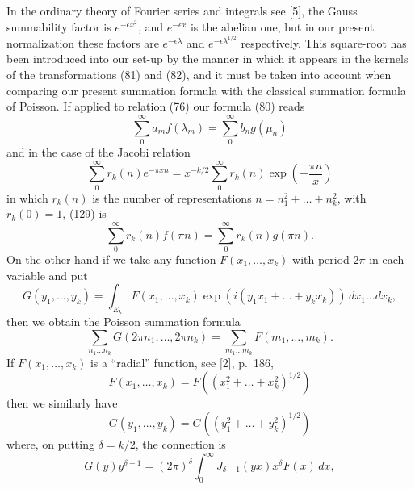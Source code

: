 \documentclass[12pt]{article}
\begin{document}
In the ordinary theory of Fourier series and integrals see [5], the Gauss summability factor is \(e^{-\epsilon x^2}\), and \(e^{-\epsilon x}\) is the abelian one, but in our present normalization these factors are \(e^{-\epsilon\lambda}\) and \(e^{-\epsilon\lambda^{1/2}}\) respectively. This square-root has been introduced into our set-up by the manner in which it appears in the kernels of the transformations (81) and (82), and it must be taken into account when comparing our present summation formula with the classical summation formula of Poisson. If applied to relation (76) our formula (80) reads
\begin{equation}
\sum_0^{\infty} a_m f(\lambda_m) = \sum_0^{\infty} b_n g(\mu_n)
\tag{129}
\end{equation}
and in the case of the Jacobi relation
\begin{equation}
\sum_0^{\infty} r_k(n)e^{-\pi xn} = x^{-k/2} \sum_0^{\infty} r_k(n) \exp \left( -\frac{\pi n}{x} \right)
\tag{130}
\end{equation}
in which \(r_k(n)\) is the number of representations \(n = n_1^2 + \dots + n_k^2\), with \(r_k(0) = 1\), (129) is
\begin{equation}
\sum_0^{\infty} r_k(n) f(\pi n) = \sum_0^{\infty} r_k(n) g(\pi n).
\tag{131}
\end{equation}
On the other hand if we take any function \(F(x_1, \dots, x_k)\) with period \(2\pi\) in each variable and put
\begin{equation}
G(y_1, \dots, y_k) = \int_{E_k} F(x_1, \dots, x_k) \exp (i(y_1 x_1 + \dots + y_k x_k)) \, dx_1 \dots dx_k,
\tag{132}
\end{equation}
then we obtain the Poisson summation formula
\begin{equation}
\sum_{n_1 \dots n_k} G(2\pi n_1, \dots, 2\pi n_k) = \sum_{m_1 \dots m_k} F(m_1, \dots, m_k).
\tag{133}
\end{equation}
If \(F(x_1, \dots, x_k)\) is a ``radial'' function, see [2], p.~186,
\begin{equation}
F(x_1, \dots, x_k) = F((x_1^2 + \dots + x_k^2)^{1/2})
\tag{134}
\end{equation}
then we similarly have
\begin{equation}
G(y_1, \dots, y_k) = G((y_1^2 + \dots + y_k^2)^{1/2})
\tag{135}
\end{equation}
where, on putting \(\delta = k/2\), the connection is
\begin{equation}
G(y)y^{\delta-1} = (2\pi)^\delta \int_0^{\infty} J_{\delta-1}(yx) x^\delta F(x) \, dx,
\tag{136}
\end{equation}
\end{document}
